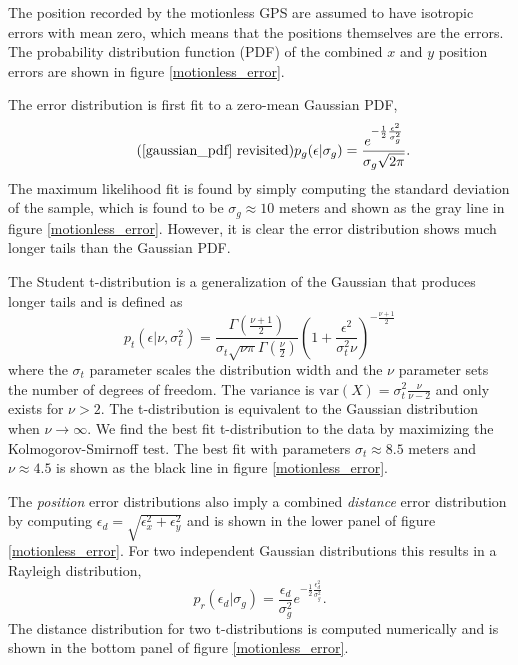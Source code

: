 \documentclass[10pt,journal]{IEEEtran}
\begin{document}
The position recorded by the motionless GPS are assumed to have isotropic errors with mean zero, which means that the positions themselves are the errors. The probability distribution function (PDF) of the combined $x$ and $y$ position errors are shown in figure \ref{motionless_error}.

The error distribution is first fit to a zero-mean Gaussian PDF,
\begin{equation}
\tag{\ref{gaussian_pdf} revisited}
p_g(\epsilon|\sigma_g) = \frac{e^{-\frac{1}{2}\frac{\epsilon^2}{\sigma_g^2}} }{\sigma_g \sqrt{ 2 \pi}}.
\end{equation}
The maximum likelihood fit is found by simply computing the standard deviation of the sample, which is found to be $\sigma_g \approx 10$ meters and shown as the gray line in figure \ref{motionless_error}. However, it is clear the error distribution shows much longer tails than the Gaussian PDF.

The Student t-distribution is a generalization of the Gaussian that produces longer tails and is defined as 
\begin{equation}
\label{student_pdf}
p_t\left(\epsilon |\nu,\sigma_t^2\right) = \frac{\Gamma\left( \frac{\nu + 1}{2} \right)}{\sigma_t \sqrt{\nu \pi} \Gamma\left(\frac{\nu}{2}\right)} \left( 1 + \frac{\epsilon^2}{\sigma_t^2 \nu} \right)^{-\frac{\nu+1}{2}}
\end{equation}
where the $\sigma_t$ parameter scales the distribution width and the $\nu$ parameter sets the number of degrees of freedom. The variance is $\textrm{var}(X)=\sigma_t^2 \frac{\nu}{\nu-2}$ and only exists for $\nu > 2$. The t-distribution is equivalent to the Gaussian distribution when $\nu \rightarrow \infty$. We find the best fit t-distribution to the data by maximizing the Kolmogorov-Smirnoff test. The best fit with parameters $\sigma_t \approx 8.5$ meters and $\nu \approx 4.5$ is shown as the black line in figure \ref{motionless_error}.

The \emph{position} error distributions also imply a combined \emph{distance} error distribution by computing $\epsilon_d = \sqrt{\epsilon_x^2 + \epsilon_y^2}$ and is shown in the lower panel of figure \ref{motionless_error}. For two independent Gaussian distributions this results in a Rayleigh distribution,
\begin{equation}
\label{rayleigh_pdf}
p_r(\epsilon_d|\sigma_g) = \frac{\epsilon_d}{\sigma_g^2 } e^{-\frac{1}{2}\frac{\epsilon_d^2}{\sigma_g^2}}.
\end{equation}
The distance distribution for two t-distributions is computed numerically and is shown in the bottom panel of figure \ref{motionless_error}.
\end{document}
